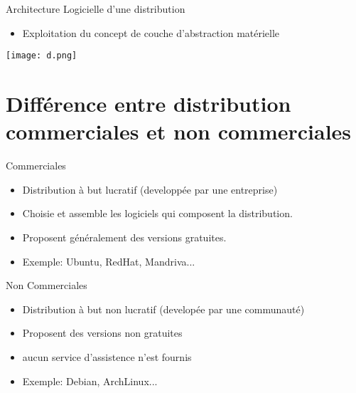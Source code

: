 \documentclass{beamer}
\begin{document}

\raggedright 
\begin{frame}

\begin{block}{Architecture Logicielle d'une distribution}
\begin{itemize}
    \item Exploitation du concept de couche d'abstraction matérielle
\end{itemize}

\centering\texttt{[image: d.png]}
\end{block}
\end{frame}

\section{Différence entre distribution commerciales et non commerciales}
\begin{frame}
\begin{block}{Commerciales}
\begin{itemize}[<+-| alert@+>]
\item Distribution à but lucratif (developpée par une entreprise) 
\item Choisie et assemble les logiciels qui composent la distribution.\\ 
\item Proposent généralement des versions gratuites.\\
\item Exemple: Ubuntu, RedHat, Mandriva...
\end{itemize}
\end{block}
\begin{block}{Non Commerciales}
\begin{itemize}[<+-| alert@+>]
\item Distribution à but non lucratif (developée par une communauté) 
\item Proposent des versions non gratuites
\item aucun service d'assistence n'est fournis
\item Exemple: Debian, ArchLinux...
\end{itemize}
\end{block}
\end{frame}
\end{document}
